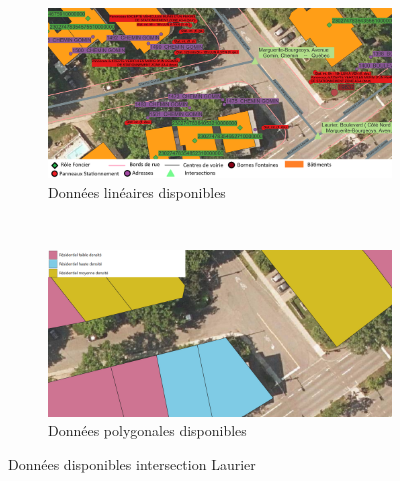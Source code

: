       \begin{figure}[ht]
        \centering
        \begin{subfigure}{\linewidth}
          \includegraphics[width=1.0\textwidth]{images/donnees_disponible_Laurier_legende_v2.png}
        \caption{Données linéaires disponibles}
        \label{fig:donnes_panneaux_Laurier}
        \end{subfigure} \\
        \begin{subfigure}{\linewidth}
          \includegraphics[width=1.0\textwidth]{images/utilisation_sols_Laurier_v2.png}
        \caption{Données polygonales disponibles}
        \label{fig:donnes_polygone_panneaux_Laurier}
        \end{subfigure}
        \caption{Données disponibles intersection Laurier}
      \end{figure}

      \FloatBarrier
